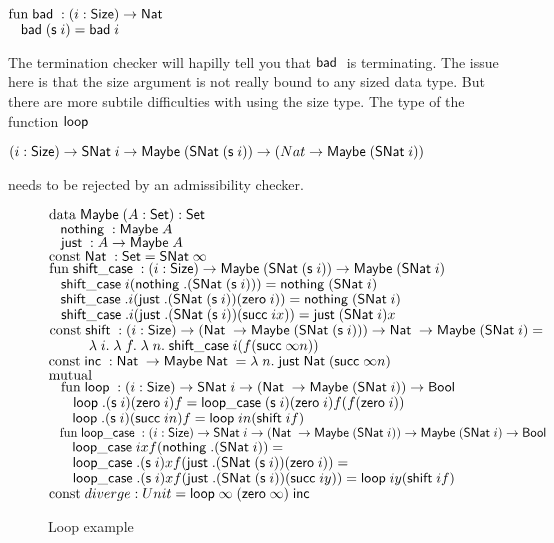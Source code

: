 \begin{bsp}
$\fun \bad : \EPi{i}{\Size}{\Nat}$\\
$\spc \bad (\s i) = \bad i $ 
\end{bsp}
The termination checker will hapilly tell you that $\bad$ is terminating.
The issue here is that the size argument is not really bound to any sized data type.
But there are more subtile difficulties with using the size type.
The type of the function $\lop$
\begin{bsp}
$\EPi{i}{\Size}{\SNat i \ra \Maybe (\SNat (\s i)) \ra (Nat \ra \Maybe (\SNat i))} $ 
\end{bsp}
needs to be rejected by an admissibility checker.
\begin{figure}
$\data \Maybe (A : \Set ) : \Set$\\
$\spc  \nothing : \Maybe A$\\
$\spc  \just : A \ra\Maybe A$\\
$\const \Nat : \Set = \SNat \infty$\\
$\fun \shiftcase : (i : \Size) \ra\Maybe (\SNat (\s i)) \ra\Maybe (\SNat i)$\\
$\spc \shiftcase i (\nothing .(\SNat (\s i))) = \nothing (\SNat i)$\\
$\spc \shiftcase .i (\just .(\SNat (\s i)) (\zero i)) = \nothing (\SNat i)$\\
$\spc \shiftcase .i (\just .(\SNat (\s i)) (\suc i x)) = \just (\SNat i) x$\\
$\const \shift : (i : \Size) \ra(\Nat \ra\Maybe (\SNat (\s i))) \ra\Nat \ra\Maybe (\SNat i) =$\\ 
$\spcx \lam{i}{\lam{f}{\lam{n}{\shiftcase i (f (\suc \infty n))}}}$\\
$\const \inc : \Nat \ra\Maybe \Nat = \lam{n}{\just \Nat (\suc \infty n)}$\\
$\mutual$\\
$\spc \fun \lop : (i : \Size ) \ra\SNat i \ra(\Nat \ra\Maybe (\SNat i)) \ra\Bool$\\
$\spc \spc \lop .(\s i) (\zero i) f = \lopcase (\s i) (\zero i) f (f (\zero i))$\\
$\spc \spc \lop .(\s i) (\suc i n) f = \lop i n (\shift i f)$\\
$\spc \fun \lopcase : (i : \Size ) \ra\SNat i \ra(\Nat \ra\Maybe (\SNat i)) \ra\Maybe (\SNat i) \ra\Bool$\\
$\spc \spc \lopcase i       x f (\nothing .(\SNat i)) = \tt$\\
$\spc \spc \lopcase .(\s i)  x f (\just .(\SNat (\s i))  (\zero i)) = \tt$\\
$\spc \spc \lopcase .(\s i)  x f (\just .(\SNat (\s i)) (\suc i y)) = \lop i y (\shift i f) $\\
$\const diverge : Unit = \lop \infty\; (\zero \infty) \; \inc$\\
\caption{Loop example}
\label{loop}
\end{figure}

